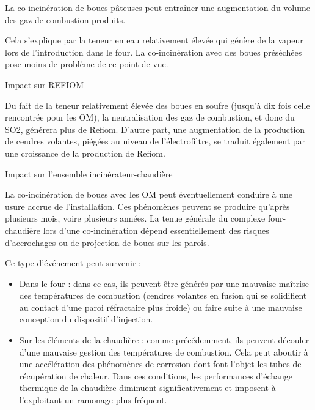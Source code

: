 \vspace{0.3cm} 
La co-incinération de boues pâteuses peut entraîner une augmentation du volume des gaz de combustion produits. 
\vspace{0.3cm}

Cela s’explique par la teneur en eau relativement élevée qui génère de la vapeur lors de l’introduction dans le four.
La co-incinération avec des boues préséchées pose moins de problème de ce point de vue.


\vspace{0.3cm}
Impact sur REFIOM
\vspace{0.3cm}

Du fait de la teneur relativement élevée des boues en soufre (jusqu’à dix fois celle rencontrée pour les OM), la neutralisation des gaz de combustion, et donc du SO2, générera plus de Refiom. D’autre part, une augmentation de la production de cendres volantes, piégées au niveau de l’électrofiltre, se traduit également par une croissance de la production de Refiom.


\vspace{0.3cm}
Impact sur l'ensemble incinérateur-chaudière
\vspace{0.3cm} 

La co-incinération de boues avec les OM peut éventuellement conduire à une usure accrue de l’installation. Ces phénomènes peuvent se produire qu’après plusieurs mois, voire plusieurs années. La tenue générale du complexe four-chaudière lors d’une co-incinération dépend essentiellement des risques d’accrochages ou de projection de boues sur les parois. 

Ce type d’événement peut survenir :

\begin{itemize}
\item Dans le four : dans ce cas, ils peuvent être générés par une mauvaise maîtrise des températures de combustion (cendres volantes en fusion qui se solidifient au contact d’une paroi réfractaire plus froide) ou faire suite à une mauvaise conception du dispositif d’injection.

\item  Sur les éléments de la chaudière : comme précédemment, ils peuvent découler d’une mauvaise gestion des températures de combustion. Cela peut aboutir à une accélération des phénomènes de corrosion dont font l’objet les tubes de récupération de chaleur. Dans ces conditions, les performances d’échange thermique de la chaudière diminuent significativement et imposent à l’exploitant un ramonage plus fréquent.

\end{itemize}


